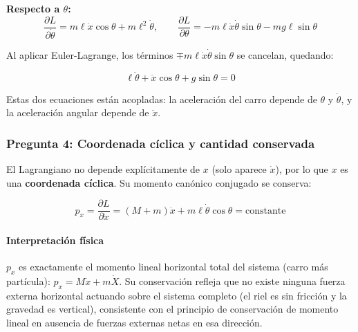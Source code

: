 \begin{sol}
\textbf{Respecto a $\theta$:}
$$\frac{\partial L}{\partial\dot\theta} = m\ell\dot{x}\cos\theta + m\ell^2\dot\theta, \qquad \frac{\partial L}{\partial\theta} = -m\ell\dot{x}\dot\theta\sin\theta - mg\ell\sin\theta$$

Al aplicar Euler-Lagrange, los términos $\mp m\ell\dot{x}\dot\theta\sin\theta$ se cancelan, quedando:

$$\boxed{\ell\ddot\theta + \ddot{x}\cos\theta + g\sin\theta = 0}$$

Estas dos ecuaciones están acopladas: la aceleración del carro depende de $\theta$ y $\dot\theta$, y la aceleración angular depende de $\ddot{x}$.

\subsubsection*{Pregunta 4: Coordenada cíclica y cantidad conservada}

El Lagrangiano no depende explícitamente de $x$ (solo aparece $\dot{x}$), por lo que $x$ es una \textbf{coordenada cíclica}. Su momento canónico conjugado se conserva:

$$p_x = \frac{\partial L}{\partial\dot{x}} = (M+m)\dot{x} + m\ell\dot\theta\cos\theta = \text{constante}$$

\paragraph{Interpretación física} $p_x$ es exactamente el momento lineal horizontal total del sistema (carro más partícula): $p_x = M\dot x + m\dot X$. Su conservación refleja que no existe ninguna fuerza externa horizontal actuando sobre el sistema completo (el riel es sin fricción y la gravedad es vertical), consistente con el principio de conservación de momento lineal en ausencia de fuerzas externas netas en esa dirección.

\end{sol}
